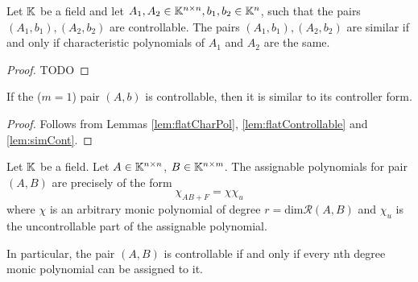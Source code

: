 \begin{lemma}
\label{lem:simCont}
    Let $\mathbb{K}$ be a field and let $A_1,A_2\in\mathbb{K}^{n\times n},b_1,b_2\in\mathbb{K}^n$, such that the pairs $(A_1,b_1),(A_2,b_2)$ are controllable. The pairs $(A_1,b_1),(A_2,b_2)$ are similar if and only if characteristic polynomials of $A_1$ and $A_2$ are the same.
\end{lemma}

\begin{proof}
    TODO
\end{proof}

\begin{cor}
    If the  ($m=1$) pair $(A,b)$ is controllable, then it is similar to its controller form.
\end{cor}

\begin{proof}
    Follows from Lemmas \ref{lem:flatCharPol}, \ref{lem:flatControllable} and \ref{lem:simCont}. 
\end{proof}

\begin{theorem}
    Let $\mathbb{K}$ be a field. Let $A\in\mathbb{K}^{n\times n}$, $B\in\mathbb{K}^{n\times m}$. The assignable polynomials for pair $(A,B)$ are precisely of the form $$\chi_{AB+F}=\chi\chi_u$$ where $\chi$ is an arbitrary monic polynomial of degree $r=\text{dim}\mathcal{R}(A,B)$ and $\chi_u$ is the uncontrollable part of the assignable polynomial.

    In particular, the pair $(A,B)$ is controllable if and only if every nth degree monic polynomial can be assigned to it.
\end{theorem}

